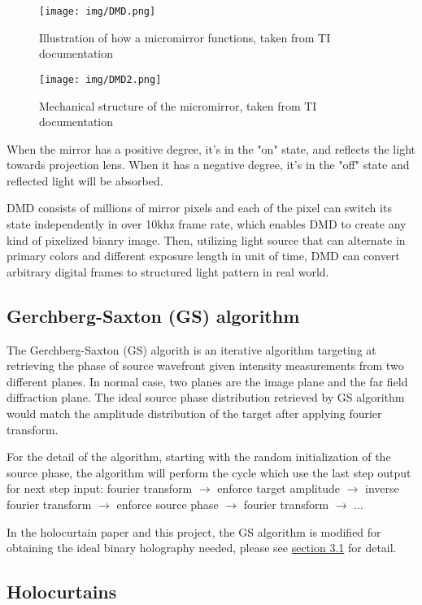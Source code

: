 \documentclass[10pt,journal,compsoc]{IEEEtran}
\begin{document}
\begin{figure}[!h]
    \centering
    \texttt{[image: img/DMD.png]}
    \caption{Illustration of how a micromirror functions, taken from TI documentation\cite{DMD}}
    \texttt{[image: img/DMD2.png]}
    \caption{Mechanical structure of the micromirror, taken from TI documentation\cite{DMD}}
\end{figure}

When the mirror has a positive degree, it's in the "on" state, and reflects the light towards projection lens. When it has a negative degree, it's in the "off" state and reflected light will be absorbed. 

DMD consists of millions of mirror pixels and each of the pixel can switch its state independently in over 10khz frame rate, which enables DMD to create any kind of pixelized bianry image. Then, utilizing light source that can alternate in primary colors and different exposure length in unit of time, DMD can convert arbitrary digital frames to structured light pattern in real world.

\subsection{Gerchberg-Saxton (GS) algorithm}
\label{sec:2.3}

The Gerchberg-Saxton (GS) algorith\cite{GS} is an iterative algorithm targeting at retrieving the phase of source wavefront given intensity measurements from two different planes. In normal case, two planes are the image plane and the far field diffraction plane. The ideal source phase distribution retrieved by GS algorithm would match the amplitude distribution of the target after applying fourier transform.

For the detail of the algorithm, starting with the random initialization of the source phase, the algorithm will perform the cycle which use the last step output for next step input: fourier transform $\rightarrow$ enforce target amplitude $\rightarrow$ inverse fourier transform $\rightarrow$ enforce source phase $\rightarrow$ fourier transform $\rightarrow$ ...

In the holocurtain paper and this project, the GS algorithm is modified for obtaining the ideal binary holography needed, please see \hyperref[sec:3.1]{section 3.1} for detail.

\subsection{Holocurtains}
\label{sec:2.4}
\end{document}
